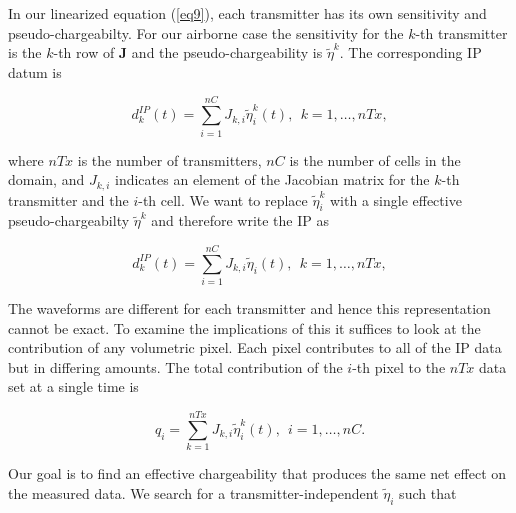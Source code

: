 \documentclass[extra,mreferee]{gji}
\newcommand{\peta}{\tilde{\eta}}
\newcommand{\dip}{d^{IP}}
\begin{document}
In our linearized equation (\ref{eq9}), each transmitter has its own sensitivity and pseudo-chargeabilty. For our airborne case the sensitivity for the $k$-th transmitter is the $k$-th row of $\mathbf{J}$ and the pseudo-chargeability is $\peta^k$. The corresponding  IP datum is 
\begin{linenomath*}
\begin{equation}
  \dip_k(t) = \sum_{i=1}^{nC}J_{k,i}\peta^k_i (t), \ \ k=1, \ldots, nTx,
  \label{eq: dip_kthTx}
\end{equation}
\end{linenomath*}
where $nTx$ is the number of transmitters, $nC$ is the number of cells in the domain, and $J_{k,i}$ indicates an element of the Jacobian matrix for the $k$-th transmitter and the $i$-th cell. We want to replace $\peta^k_i$ with a single effective pseudo-chargeabilty $\peta^k$ and therefore write the IP as 
\begin{linenomath*}
\begin{equation}
  \dip_k(t) = \sum_{i=1}^{nC}J_{k,i}\peta_i (t), \ \ k=1, \ldots, nTx,
  \label{eq: dipeff_kthTx}
\end{equation}
\end{linenomath*}
The waveforms are different for each transmitter and hence this representation cannot be exact. To examine the implications of this it suffices to look at the contribution of any volumetric pixel. Each pixel contributes to all of the IP data but in differing amounts. The total contribution of the  $i$-th pixel to the $nTx$ data set at a single time is  
\begin{linenomath*}
\begin{equation}
  q_i =\sum_{k=1}^{nTx} J_{k,i} \peta^k_i(t), \ \ i=1, \ldots, nC.
  \label{eq: dip_hat}
\end{equation}
\end{linenomath*}
Our goal is to find an effective chargeability that produces the same net effect on the measured data. We search for a transmitter-independent $\peta_i$ such that 
\end{document}
